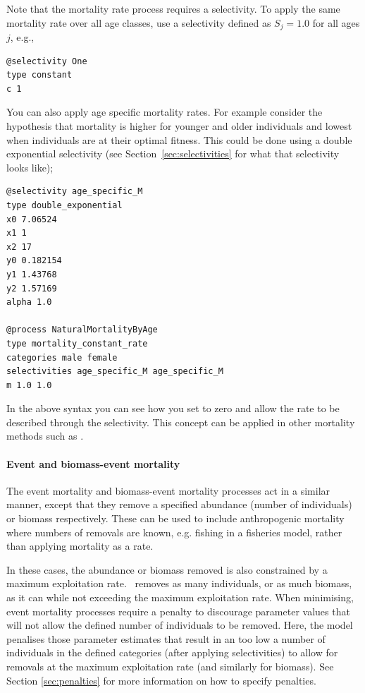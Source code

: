 Note that the mortality rate process requires a selectivity. To apply the same mortality rate over all age classes, use a selectivity defined as $S_j=1.0$ for all ages $j$, e.g.,

{\small{\begin{verbatim}
@selectivity One
type constant
c 1
\end{verbatim}}}

You can also apply age specific mortality rates. For example consider the hypothesis that mortality is higher for younger and older individuals and lowest when individuals are at their optimal fitness. This could be done using a double exponential selectivity (see Section~\ref{sec:selectivities} for what that selectivity looks like);

{\small{\begin{verbatim}
@selectivity age_specific_M
type double_exponential
x0 7.06524
x1 1
x2 17
y0 0.182154 
y1 1.43768
y2 1.57169
alpha 1.0

@process NaturalMortalityByAge
type mortality_constant_rate
categories male female
selectivities age_specific_M age_specific_M
m 1.0 1.0
\end{verbatim}}}

In the above syntax you can see how you set  to zero and allow the rate to be described through the selectivity. This concept can be applied in other mortality methods such as .
\paragraph{Event and biomass-event mortality}

The event mortality and biomass-event mortality processes act in a similar manner, except that they remove a specified abundance (number of individuals) or biomass respectively. These can be used to include anthropogenic mortality where numbers of removals are known, e.g. fishing in a fisheries model, rather than applying mortality as a rate. 

In these cases, the abundance or biomass removed is also constrained by a maximum exploitation rate. \CNAME\ removes as many individuals, or as much biomass, as it can while not exceeding the maximum exploitation rate. When minimising, event mortality processes require a penalty to discourage parameter values that will not allow the defined number of individuals to be removed. Here, the model penalises those parameter estimates that result in an too low a number of individuals in the defined categories (after applying selectivities) to allow for removals at the maximum exploitation rate (and similarly for biomass). See Section \ref{sec:penalties} for more information on how to specify penalties.

